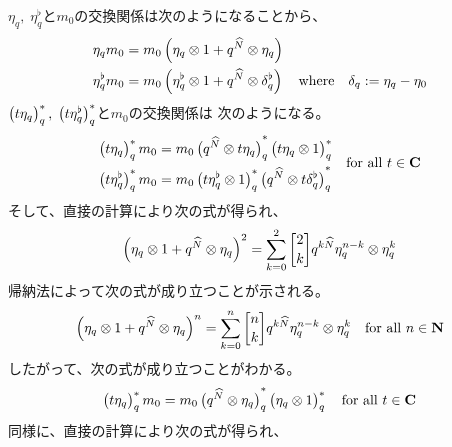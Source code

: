 {	\begin{note}[q-Kleeneスターの余積]\label{note:q-Kleeneスターの余積} %
		$\eta_q,\;\eta_q^\flat$と$m_0$の交換関係は次のようになることから、
		\begin{equation*}\begin{split}
			\eta_qm_0 &= m_0\mathinner{\left({\eta_q\otimes1 + q^{{\widehat{N}}}\otimes\eta_q}\right)} \\
			\eta_q^\flat m_0 &= m_0\mathinner{\left({\eta_q^\flat\otimes1 
				+ q^{{\widehat{N}}}\otimes\delta_q^\flat}\right)} \quad\text{where}\quad 
				\delta_q := \eta_q - \eta_0
		\end{split}\end{equation*}
		$\mathinner{\bigl({t\eta_q}\bigr)}_q^*,\;\mathinner{\bigl({t\eta_q^\flat}\bigr)}_q^*$と$m_0$の交換関係は
		次のようになる。
		\begin{equation*}\begin{split}
			\mathinner{\bigl({t\eta_q}\bigr)}_q^*m_0 &= m_0 \mathinner{\bigl({q^{{\widehat{N}}}\otimes t\eta_q}\bigr)}_q^* 
				\mathinner{\bigl({t\eta_q\otimes1}\bigr)}_q^* \\
			\mathinner{\bigl({t\eta_q^\flat}\bigr)}_q^*m_0 &= m_0 \mathinner{\bigl({t\eta_q^\flat\otimes1}\bigr)}_q^*
				\mathinner{\bigl({q^{{\widehat{N}}}\otimes t\delta_q^\flat}\bigr)}_q^*
		\end{split}
			\quad\text{for all } t\in\mathbf{C}
		\end{equation*}
		そして、直接の計算により次の式が得られ、
		\begin{equation*}\begin{split}
			\plr{\eta_q\otimes1 + q^{\Nhat}\otimes\eta_q}^2
			= \sum_{k=0}^2 \qbinom{2}{k} q^{k\Nhat}\eta_q^{n-k}\otimes\eta_q^k
		\end{split}\end{equation*}
		帰納法によって次の式が成り立つことが示される。
		\begin{equation*}\begin{split}
			\plr{\eta_q\otimes1 + q^{\Nhat}\otimes\eta_q}^n
			= \sum_{k=0}^n \qbinom{n}{k} q^{k\Nhat}\eta_q^{n-k}\otimes\eta_q^k
			\quad\text{for all } n\in\sizen
		\end{split}\end{equation*}
		したがって、次の式が成り立つことがわかる。
		\begin{equation*}\begin{split}
			\mathinner{\bigl({t\eta_q}\bigr)}_q^*m_0 = m_0\mathinner{\bigl({q^{{\widehat{N}}}\otimes\eta_q}\bigr)}_q^*
				\mathinner{\bigl({\eta_q\otimes1}\bigr)}_q^* \quad\text{for all } t\in\mathbf{C}
		\end{split}\end{equation*}
		同様に、直接の計算により次の式が得られ、
		\begin{equation*}\begin{split}

\end{split}
\end{equation*}
\end{note}}
